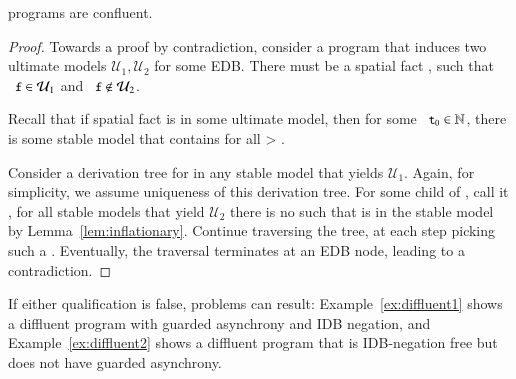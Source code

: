 \begin{theorem}
\label{thm:confluence}
\slang programs are confluent.
\end{theorem}
\begin{proof}

Towards a proof by contradiction, consider a \slang program that 
induces two ultimate models $\mathcal{U}_1, \mathcal{U}_2$ for some EDB.  There must be a spatial fact , such that 
$\dedalus{f} \in \mathcal{U}_1$ and $\dedalus{f} \not\in \mathcal{U}_2$.

Recall that if spatial fact  is in some ultimate model, then for some $\dedalus{t\sub{0}} \in \mathbb{N}$, there is some stable model that contains  for all  > .

Consider a derivation tree for  in any stable model that yields $\mathcal{U}_1$.  Again, for simplicity, we assume uniqueness of this derivation tree.  For some child of , call it , for all stable models that yield $\mathcal{U}_2$ there is no  such that  is in the stable model by Lemma~\ref{lem:inflationary}.  Continue traversing the tree, at each step picking such a .  Eventually, the traversal terminates at an EDB node, leading to a contradiction.
\end{proof}


If either qualification is false, problems can result: Example~\ref{ex:diffluent1} shows a diffluent program with guarded asynchrony and IDB negation, and Example~\ref{ex:diffluent2} shows a diffluent program that is IDB-negation free but does not have guarded asynchrony.

